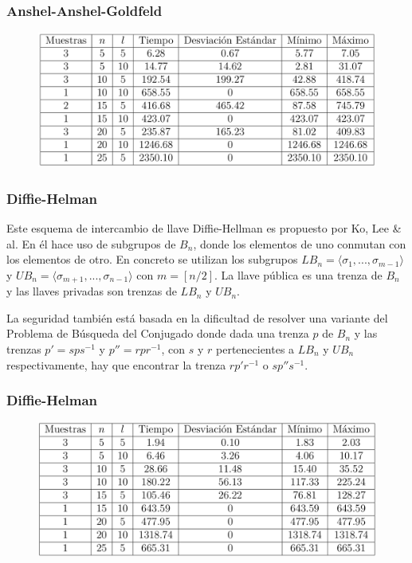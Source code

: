 \documentclass{beamer}
\begin{document}
\begin{frame}
\frametitle{Anshel-Anshel-Goldfeld}

\begin{figure}
\includegraphics[scale=0.198]{imgs/imgs_trenzas/result_anshel}
\end{figure}

\end{frame}


\begin{frame}
\frametitle{Diffie-Helman}

Este esquema de intercambio de llave Diffie-Hellman es propuesto por Ko, Lee \& al. En él hace uso de subgrupos de $B_n$, donde los elementos de uno conmutan con los elementos de otro. En concreto se utilizan los subgrupos $LB_n =\langle\sigma_1,...,\sigma_{m-1}\rangle$ y  $UB_n=\langle\sigma_{m+1},...,\sigma_{n-1}\rangle$ con $m=[n/2]$. La llave pública es una trenza de $B_n$ y las llaves privadas son trenzas de $LB_n$ y $UB_n$.
\newline

La seguridad también está basada en la dificultad de resolver una variante del Problema de Búsqueda del Conjugado donde dada una trenza $p$ de $B_n$ y las trenzas $p'=sps^{-1}$ y $p''=rpr^{-1}$, con $s$ y $r$ pertenecientes a $LB_n$ y $UB_n$ respectivamente, hay que encontrar la trenza $rp'r^{-1}$ o $sp''s^{-1}$.

\end{frame}


\begin{frame}
\frametitle{Diffie-Helman}

\begin{figure}
\includegraphics[scale=0.198]{imgs/imgs_trenzas/result_ko}
\end{figure}

\end{frame}
\end{document}
